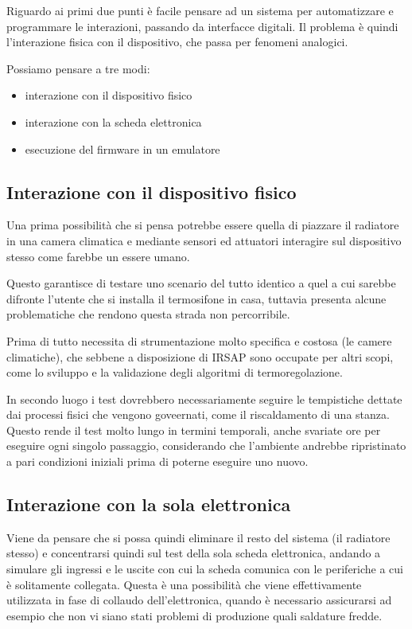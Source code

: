 \documentclass[12pt,a4paper,twoside,titlepage]{book}
\begin{document}
Riguardo ai primi due punti è facile pensare ad un sistema per automatizzare e programmare
le interazioni, passando da interfacce digitali. Il problema è quindi l'interazione fisica
con il dispositivo, che passa per fenomeni analogici.

Possiamo pensare a tre modi:

\begin{itemize}
    \item interazione con il dispositivo fisico
    \item interazione con la scheda elettronica
    \item esecuzione del \gls{firmware} in un emulatore
\end{itemize}

\subsection{Interazione con il dispositivo fisico}

Una prima possibilità che si pensa potrebbe essere quella di piazzare il radiatore in una camera
climatica e mediante sensori ed attuatori interagire sul dispositivo stesso come farebbe
un essere umano.

Questo garantisce di testare uno scenario del tutto identico a quel a cui sarebbe
difronte l'utente che si installa il termosifone in casa, tuttavia presenta alcune
problematiche che rendono questa strada non percorribile.

Prima di tutto necessita di strumentazione molto specifica e costosa (le camere climatiche),
che sebbene a disposizione di IRSAP sono occupate per altri scopi, come lo sviluppo e
la validazione degli algoritmi di termoregolazione.

In secondo luogo i test dovrebbero necessariamente seguire le tempistiche dettate dai processi
fisici che vengono goveernati, come il riscaldamento di una stanza.
Questo rende il test molto lungo in termini temporali, anche svariate ore per eseguire ogni singolo
passaggio, considerando che l'ambiente andrebbe ripristinato a pari condizioni iniziali prima
di poterne eseguire uno nuovo.

\subsection{Interazione con la sola elettronica}

Viene da pensare che si possa quindi eliminare il resto del sistema (il radiatore
stesso) e concentrarsi quindi sul test della sola scheda elettronica, andando a
simulare gli ingressi e le uscite con cui la scheda comunica con le periferiche
a cui è solitamente collegata. Questa è una possibilità che viene effettivamente
utilizzata in fase di collaudo dell'elettronica, quando è necessario assicurarsi ad
esempio che non vi siano stati problemi di produzione quali saldature fredde.
\end{document}
